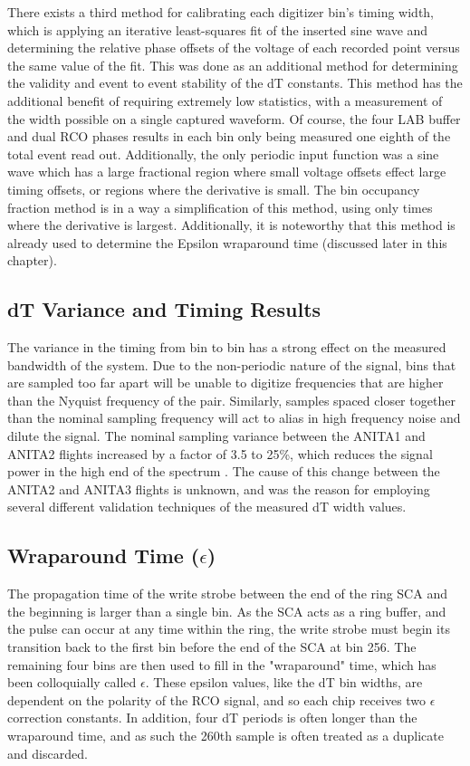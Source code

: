 	There exists a third method for calibrating each digitizer bin's timing width, which is applying an iterative least-squares fit of the inserted sine wave and determining the relative phase offsets of the voltage of each recorded point versus the same value of the fit.  This was done as an additional method for determining the validity and event to event stability of the dT constants.  This method has the additional benefit of requiring extremely low statistics, with a measurement of the width possible on a single captured waveform.  Of course, the four LAB buffer and dual RCO phases results in each bin only being measured one eighth of the total event read out.  Additionally, the only periodic input function was a sine wave which has a large fractional region where small voltage offsets effect large timing offsets, or regions where the derivative is small.  The bin occupancy fraction method is in a way a simplification of this method, using only times where the derivative is largest.  Additionally, it is noteworthy that this method is already used to determine the Epsilon wraparound time (discussed later in this chapter).
	
	
	
	


	\subsection{dT Variance and Timing Results}	
		The variance in the timing from bin to bin has a strong effect on the measured bandwidth of the system.  Due to the non-periodic nature of the signal, bins that are sampled too far apart will be unable to digitize frequencies that are higher than the Nyquist frequency of the pair.  Similarly, samples spaced closer together than the nominal sampling frequency will act to alias in high frequency noise and dilute the signal.  The nominal sampling variance between the ANITA1 and ANITA2 flights increased by a factor of 3.5 to 25\%, which reduces the signal power in the high end of the spectrum .  The cause of this change between the ANITA2 and ANITA3 flights is unknown, and was the reason for employing several different validation techniques of the measured dT width values.
		
		
	\subsection{Wraparound Time ($\epsilon$)}
		The propagation time of the write strobe between the end of the ring SCA and the beginning is larger than a single bin.  As the SCA acts as a ring buffer, and the pulse can occur at any time within the ring, the write strobe must begin its transition back to the first bin before the end of the SCA at bin 256.  The remaining four bins are then used to fill in the "wraparound" time, which has been colloquially called $\epsilon$.  These epsilon values, like the dT bin widths, are dependent on the polarity of the RCO signal, and so each chip receives two $\epsilon$ correction constants. In addition, four dT periods is often longer than the wraparound time, and as such the 260th sample is often treated as a duplicate and discarded.
		
